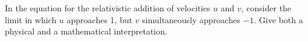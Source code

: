 In the equation for the relativistic addition of velocities $u$ and $v$, consider
the limit in which $u$ approaches 1, but $v$ simultaneously approaches $-1$.
Give both a physical and a mathematical interpretation.
